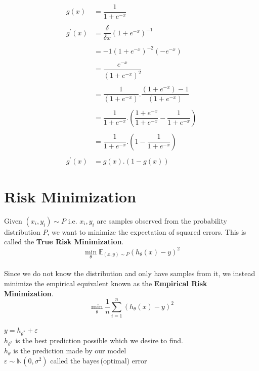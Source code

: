 \documentclass[12pt,a4paper,titlepage,landscape]{book}
\begin{document}
	\begin{equation*}
	\begin{array}{cl}
		g(x) &= \dfrac{1}{1+e^{-x}} \\\\
		g^{'}(x) &= \dfrac{\delta}{\delta{x}} \left(1 + e^{-x}\right)^{-1} \\\\
		&= -1(1+e^{-x})^{-2}(-e^{-x}) \\\\
		&= \dfrac{e^{-x}}{\left(1+e^{-x}\right)^2} \\\\
		&= \dfrac{1}{\left(1+e^{-x}\right)}.\dfrac{(1+e^{-x})-1}{\left(1+e^{-x}\right)} \\\\
		&= \dfrac{1}{1+e^{-x}}.\left(\dfrac{1+e^{-x}}{1+e^{-x}} - \dfrac{1}{1+e^{-x}}\right) \\
		\\
		&= \dfrac{1}{1+e^{-x}}.\left(1 - \dfrac{1}{1+e^{-x}}\right) \\\\
		g^{'}(x) &= g(x).(1-g(x))
	\end{array}
	\end{equation*}
	
	\section{Risk Minimization}
	Given $(x_i, y_i)\sim P$ i.e. $x_i, y_i$ are samples observed from the probability distribution $P$, we want to minimize the expectation of squared errors. This is called the \textbf{True Risk Minimization}.
	$$\min\limits_{\theta}\mathbb{E}_{(x,y)\sim{P}} (h_\theta(x)-y)^2$$ \\
	Since we do not know the distribution and only have samples from it, we instead minimize the empirical equivalent known as the \textbf{Empirical Risk Minimization}.
	$$\min\limits_{\theta} \dfrac{1}{n} \sum_{i=1}^{n} (h_\theta(x)-y)^2$$ \\
	$y = h_{\theta^*}+\varepsilon$\\
	$h_{\theta^*}$ is the best prediction possible which we desire to find. \\
	$h_{\theta}$ is the prediction made by our model \\
	$\varepsilon \sim \mathbb{N}(0, \sigma^2)$ called the bayes\,(optimal) error\\
	
\end{document}
